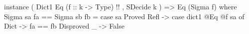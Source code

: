 \begin{code}
instance ( Dict1 Eq (f :: k -> Type)  !!
         , SDecide k
         ) => Eq (Sigma f) where
  Sigma sa fa == Sigma sb fb =
    case sa %
      Proved Refl ->
        case dict1 @Eq @f sa of
          Dict -> fa == fb
      Disproved _ -> False
\end{code}
